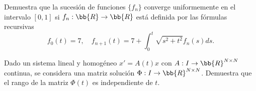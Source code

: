 \documentclass[12pt]{article}
\begin{document}
    \begin{ejercicio}
        Demuestra que la sucesión de funciones $\{f_n\}$ converge uniformemente en el intervalo $[0,1]$ si $f_n: \bb{R} \to \bb{R}$ está definida por las fórmulas recursivas
        \[
            f_0(t) = 7, \quad f_{n+1}(t) = 7 + \int_0^t \sqrt{s^2+t^2}f_n(s)ds.
        \]
    \end{ejercicio}

    \begin{ejercicio}
        Dado un sistema lineal y homogéneo $x' = A(t)x$ con $A: I \to \bb{R}^{N\times N}$ continua, se considera una matriz solución $\Phi: I \to \bb{R}^{N\times N}$. Demuestra que el rango de la matriz $\Phi(t)$ es independiente de $t$.
    \end{ejercicio}
\end{document}
